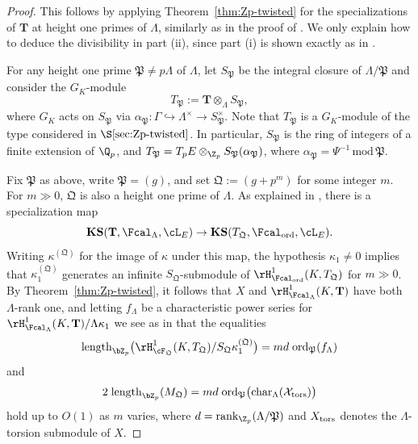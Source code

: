 \begin{proof}
This follows by applying Theorem~\ref{thm:Zp-twisted} for the specializations of $\mathbf{T}$ at height one primes of $\Lambda$, similarly as in the proof of \cite[Thm.~2.2.10]{howard}. We only explain how to deduce the divisibility in part (ii), since part (i) is shown exactly as in \cite[Thm.~2.2.10]{howard}.

For any height one prime $\mathfrak{P}\neq p\Lambda$ of $\Lambda$, let $S_{\mathfrak{P}}$ be the integral closure of $\Lambda/\mathfrak{P}$ and consider the $G_K$-module
\[
T_\mathfrak{P}:=\mathbf{T}\otimes_\Lambda S_{\mathfrak{P}},
\]
where $G_K$ acts on $S_\mathfrak{P}$ via $\alpha_\mathfrak{P}:\Gamma\hookrightarrow\Lambda^\times\rightarrow S_\mathfrak{P}^\times$. Note that $T_\mathfrak{P}$ is a $G_K$-module of the type considered in $\S\ref{sec:Zp-twisted}$.
In particular, $S_\mathfrak{P}$ is the ring of integers of a finite extension of $\Q_p$, and
$T_\mathfrak{P} = T_pE\otimes_{\Z_p}S_\mathfrak{P}(\alpha_\mathfrak{P})$, where
$\alpha_\mathfrak{P} = \Psi^{-1} \,\mathrm{mod}\, \mathfrak{P}$.


Fix $\mathfrak{P}$ as above, write $\mathfrak{P}=(g)$, and set $\mathfrak{Q}:=(g+p^m)$ for some integer $m$.
For $m\gg 0$, $\mathfrak{Q}$ is also a height one prime of $\Lambda$. As explained in \cite[p.~1463]{howard}, there is a specialization map
\[
\mathbf{KS}(\mathbf{T},\Fcal_\Lambda,\cL_E)\rightarrow
\mathbf{KS}(T_{\mathfrak{Q}},\Fcal_{\rm ord},\cL_E).
\]
Writing $\kappa^{(\mathfrak{Q})}$ for the image of $\kappa$ under this map, the hypothesis $\kappa_1\neq 0$ implies that $\kappa_1^{(\mathfrak{Q})}$ generates an infinite $S_{\mathfrak{Q}}$-submodule of $\rH^1_{\Fcal_{\rm ord}}(K,T_{\mathfrak{Q}})$ for $m\gg 0$. By Theorem~\ref{thm:Zp-twisted}, it follows that $X$ and $\rH^1_{\Fcal_\Lambda}(K,\mathbf{T})$ have both $\Lambda$-rank one, and letting $f_\Lambda$ be a characteristic power series for $\rH^1_{\Fcal_\Lambda}(K,\mathbf{T})/\Lambda\kappa_1$ we see as in \cite[p.~1463]{howard} that the equalities
\[
{\rm length}_{\bZ_p}\bigl(\rH^1_{\cF_{\mathfrak{Q}}}(K,T_{\mathfrak{Q}})/S_{\mathfrak{Q}}\kappa_1^{(\mathfrak{Q})}\bigr)=md\;{\rm ord}_{\mathfrak{P}}(f_\Lambda)
\]
and
\[
2\;{\rm length}_{\bZ_p}(M_{\mathfrak{Q}})=md\;{\rm ord}_{\mathfrak{P}}\bigl({\rm char}_\Lambda(\mathcal{X}_{\rm tors})\bigr)
\]
hold up to $O(1)$ as $m$ varies, where $d={\rm rank}_{\Z_p}(\Lambda/\mathfrak{P})$ and  $X_{\rm tors}$ denotes the $\Lambda$-torsion submodule of $X$.


\end{proof}
